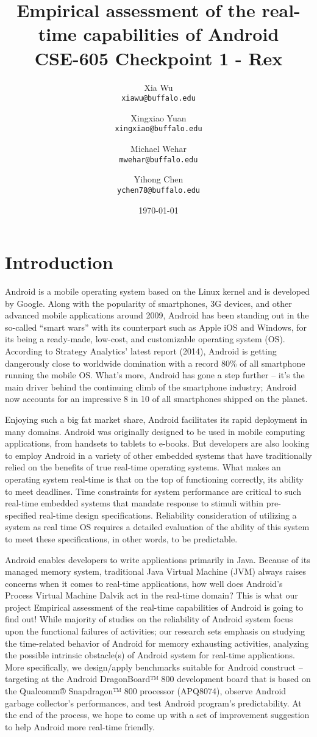 \documentclass[11pt]{article}
\author{Xia Wu\\ \texttt{xiawu@buffalo.edu} \and Xingxiao Yuan\\ \texttt{xingxiao@buffalo.edu} \and Michael Wehar\\ \texttt{mwehar@buffalo.edu} \and Yihong Chen\\ \texttt{ychen78@buffalo.edu}}
\date{\today}
\title{Empirical assessment of the real-time capabilities of Android\\\large CSE-605 Checkpoint 1 - Rex}
\begin{document}
\maketitle
\tableofcontents


\section{Introduction}
\label{sec-1}
Android is a mobile operating system based on the Linux kernel and is developed by Google. Along with the popularity of smartphones, 3G devices, and other advanced mobile applications around 2009, Android has been standing out in the so-called “smart wars” with its counterpart such as Apple iOS and Windows, for its being a ready-made, low-cost, and customizable operating system (OS). According to Strategy Analytics’ latest report (2014), Android is getting dangerously close to worldwide domination with a record 80\% of all smartphone running the mobile OS. What’s more, Android has gone a step further – it’s the main driver behind the continuing climb of the smartphone industry; Android now accounts for an impressive 8 in 10 of all smartphones shipped on the planet.

Enjoying such a big fat market share, Android facilitates its rapid deployment in many domains. Android was originally designed to be used in mobile computing applications, from handsets to tablets to e-books. But developers are also looking to employ Android in a variety of other embedded systems that have traditionally relied on the benefits of true real-time operating systems. What makes an operating system real-time is that on the top of functioning correctly, its ability to meet deadlines. Time constraints for system performance are critical to such real-time embedded systems that mandate response to stimuli within pre-specified real-time design specifications. Reliability consideration of utilizing a system as real time OS requires a detailed evaluation of the ability of this system to meet these specifications, in other words, to be predictable.

Android enables developers to write applications primarily in Java.  Because of its managed memory system, traditional Java Virtual Machine (JVM) always raises concerns when it comes to real-time applications, how well does Android’s Process Virtual Machine Dalvik act in the real-time domain? This is what our project Empirical assessment of the real-time capabilities of Android is going to find out! While majority of studies on the reliability of Android system focus upon the functional failures of activities; our research sets emphasis on studying the time-related behavior of Android for memory exhausting activities, analyzing the possible intrinsic obstacle(s) of Android system for real-time applications. More specifically, we design/apply benchmarks suitable for Android construct -- targeting at  the Android DragonBoard™ 800 development board that is based on the Qualcomm® Snapdragon™ 800 processor (APQ8074), observe Android garbage collector’s performances, and test Android program’s predictability. At the end of the process, we hope to come up with a set of improvement suggestion to help Android more real-time friendly.
\end{document}

